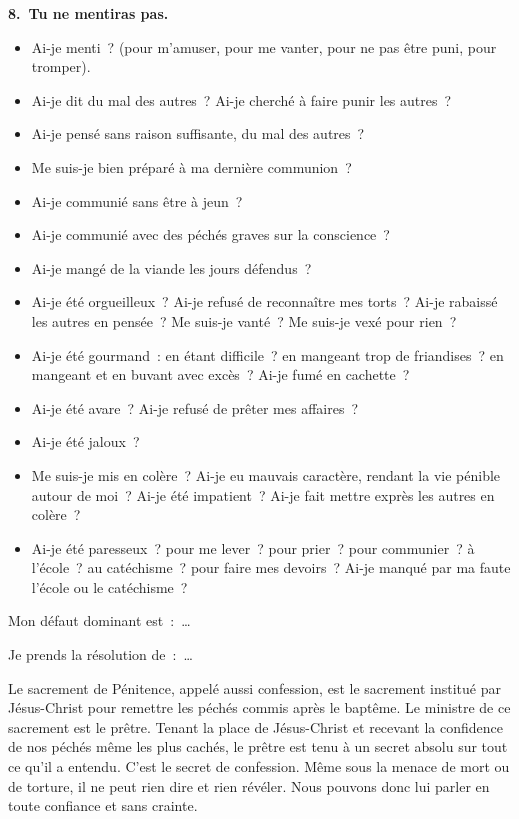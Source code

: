 \documentclass[%
a5paper%
,11pt%
,DIV=15%
,titlepage=on%
,headings=optiontoheadandtoc%
,headings=small%
,parskip=false%
,titlepage%
,openany%
]{scrbook}
\newcommand{\commandement}[1]{\noindent\textbf{#1}}
\begin{document}
\commandement{8. Tu ne mentiras pas.}
\begin{itemize}
\item Ai-je menti ? (pour m’amuser, pour me vanter, pour ne pas être puni, pour tromper).
\item Ai-je dit du mal des autres ? Ai-je cherché à faire punir les autres ?
\item  Ai-je pensé sans raison suffisante, du mal des autres ?
\end{itemize}



\begin{itemize}
\item Me suis-je bien préparé à ma dernière
 communion ?
\item Ai-je communié sans être à jeun ?
\item Ai-je communié avec des péchés graves sur la conscience ?
\item Ai-je mangé de la viande les jours défendus ?
\end{itemize}



\begin{itemize}
\item Ai-je été orgueilleux ? Ai-je refusé de reconnaître mes torts ? Ai-je rabaissé les autres en pensée ? Me suis-je vanté ? Me suis-je vexé pour rien ?
\item Ai-je été gourmand : en étant difficile ? en mangeant trop de friandises ? en
mangeant et en buvant avec excès ? Ai-je fumé en cachette ?
\item Ai-je été avare ? Ai-je refusé de prêter mes affaires ?
\item Ai-je été jaloux ?
\item Me suis-je mis en colère ? Ai-je eu mauvais caractère, rendant la vie pénible
autour de moi ? Ai-je été impatient ? Ai-je fait mettre exprès les autres en colère ?
\item Ai-je été paresseux ? pour me lever ? pour prier ? pour communier ? à l’école ? au catéchisme ? pour faire mes devoirs ? Ai-je manqué par ma faute l’école ou le catéchisme ?
\end{itemize}

Mon défaut dominant est : …

Je prends la résolution de : …



Le sacrement de Pénitence, appelé aussi confession, est le sacrement institué par Jésus-Christ pour remettre les péchés commis après le baptême. Le ministre de ce sacrement est le prêtre. Tenant la place de Jésus-Christ et recevant la confidence de nos péchés même les plus cachés, le prêtre est tenu à un secret absolu sur tout ce qu’il a entendu. C’est le secret de confession. Même sous la menace de mort ou de torture, il ne peut rien dire et rien révéler. Nous pouvons donc lui parler en toute confiance et sans crainte.
\end{document}
